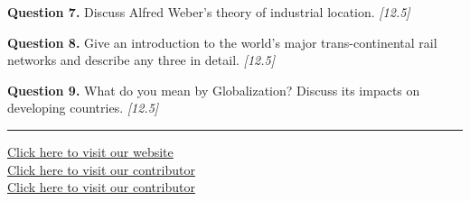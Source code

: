 \documentclass[11pt,a4paper]{article}
\newcommand{\pts}[1]{\hfill   \textit{[#1]}}
\begin{document}
\medskip


\noindent   \textbf{Question 7.} Discuss Alfred Weber's theory of industrial location. \pts{12.5}

\medskip


\noindent   \textbf{Question 8.} Give an introduction to the world's major trans-continental rail networks and describe any three in detail. \pts{12.5}

\medskip


\noindent   \textbf{Question 9.} What do you mean by Globalization? Discuss its impacts on developing countries. \pts{12.5}

\vfill\rule{\linewidth}{0.4pt}

\begin{center}\small
\href{https://bhu-exam.vercel.app/}{Click here to visit our website}\\[4pt]
\href{https://me-aryan.vercel.app/}{Click here to visit our contributor}\\[4pt]
\href{https://quashan-me.vercel.app/}{Click here to visit our contributor}
\end{center}
\end{document}
